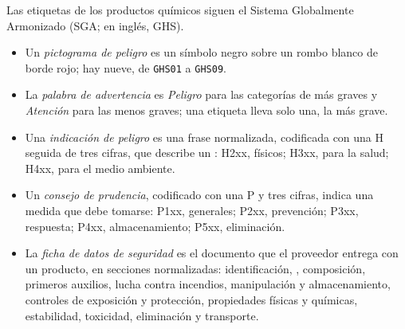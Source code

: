 \begin{definition}\label{def:b1:lab-techniques-1:ghs}
Las etiquetas de los productos químicos siguen el Sistema Globalmente
Armonizado (SGA; en inglés, GHS).
\begin{itemize}
  \item Un \emph{pictograma de peligro} es un
        símbolo negro sobre un rombo blanco de borde rojo; hay nueve, de
        \texttt{GHS01} a \texttt{GHS09}.
  \item La \emph{palabra de advertencia} es
        \emph{Peligro} para las categorías de  más graves y
        \emph{Atención} para las menos graves; una etiqueta lleva solo una,
        la más grave.
  \item Una \emph{indicación de peligro} es una frase
        normalizada, codificada con una H seguida de tres cifras, que
        describe un : H2xx,  físicos; H3xx,  para
        la salud; H4xx,  para el medio ambiente.
  \item Un \emph{consejo de prudencia},
        codificado con una P y tres cifras, indica una medida que debe
        tomarse: P1xx, generales; P2xx, prevención; P3xx, respuesta;
        P4xx, almacenamiento; P5xx, eliminación.
  \item La \emph{ficha de datos de seguridad} es el
        documento que el proveedor entrega con un producto, en secciones
        normalizadas: identificación, , composición, primeros
        auxilios, lucha contra incendios, manipulación y almacenamiento,
        controles de exposición y protección, propiedades físicas y
        químicas, estabilidad, toxicidad, eliminación y transporte.
\end{itemize}
\end{definition}

